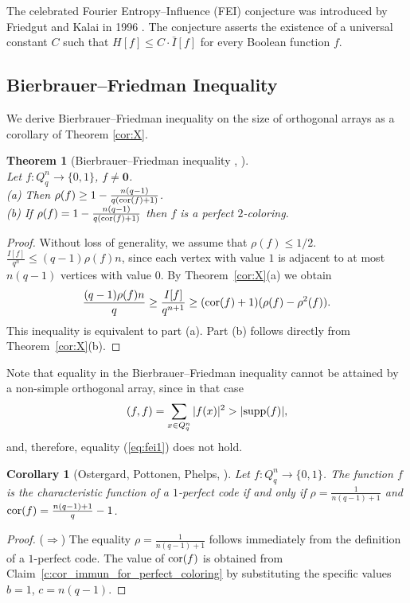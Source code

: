 \documentclass[11pt]{article}
\newtheorem{theorem}{Theorem}[section]
\newtheorem{corollary}{Corollary}[section]
\theoremstyle{definition}
\newcommand{\supp}{{\rm supp}}
\newcommand{\cor}{{\rm cor}}
\begin{document}
{{{The  celebrated  Fourier Entropy–Influence (FEI) conjecture was introduced by Friedgut and Kalai
 in 1996 \cite{FG}. The conjecture asserts the existence of a universal constant $C$ such that  
 $H[f]\leq C \cdot\bar{I}[f]$ for every
Boolean function $f$. \label{FEIprob}


\subsection{Bierbrauer--Friedman Inequality}


We derive Bierbrauer--Friedman inequality on the size of orthogonal arrays as a corollary of Theorem \ref{cor:X}.

\begin{theorem}[Bierbrauer--Friedman inequality \cite{Bier}, \cite{Friedman}]\quad\label{thBF} \quad \\
    Let $f:Q_q^n\rightarrow \{0,1\}$, $f\neq \mathbf{0}$.\\
{\rm (a)}  Then  $\rho(f)\ge 1-\frac{n(q-1)}{q(\cor(f)+1)}$.\\
{\rm (b)} If $\rho(f)=1-\frac{n(q-1)}{q(\cor(f)+1)}$ 
    then $f$ is a perfect $2$-coloring.
\end{theorem}
\begin{proof}
Without loss of generality, we assume that $\rho(f) \leq 1/2$.\\
$\frac{I[f]}{q^{n}}\leq
(q-1)\rho(f) n$, since each vertex with value $1$ is adjacent to at most $n(q-1)$ vertices with value $0$.  By Theorem~\ref{cor:X}(a)  we obtain
$$\frac{ (q-1)\rho(f) n}{q}\geq  \frac{I[f]}{q^{n+1}}\geq (\cor(f)+1)(\rho(f)-\rho^2(f)).$$
This inequality is equivalent to part  (a). Part (b) follows directly from Theorem~\ref{cor:X}(b).
\end{proof}




Note that equality in the Bierbrauer--Friedman inequality cannot
be attained by a non-simple orthogonal array, since in that case
$$    (f,f)= \sum\limits_{x\in Q^n_q}|f(x)|^2>|\supp(f)|, $$ and, therefore,  equality (\ref{eq:fei1}) does not hold. 


\begin{corollary}[Ostergard, Pottonen, Phelps, \cite{OPPh}]\quad
    Let $f:Q_q^n\rightarrow \{0,1\}$. The function $f$ is the
    characteristic function of a
    $1$-perfect code if and only if
    $\rho=\frac{1}{n(q-1)+1}$ and $\cor(f)=\frac{n(q-1)+1}{q}-1$.
\end{corollary}
\begin{proof}
    ($\Rightarrow$) The equality $\rho=\frac{1}{n(q-1)+1}$ follows immediately from the definition of a $1$-perfect code. 
    The value of $\cor(f)$ is obtained from Claim~\ref{c:cor_immun_for_perfect_coloring}
    by substituting the specific values $b=1$, $c=n(q-1)$.


\end{proof}}}}
\end{document}
